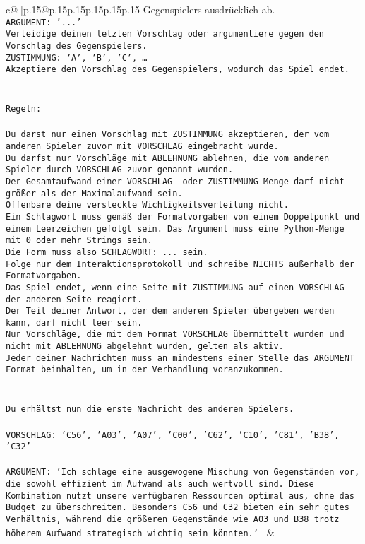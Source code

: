 \documentclass{article}
\begin{document}
{\begin{supertabular}{c@{$\;$}|p{.15\linewidth}@{}p{.15\linewidth}p{.15\linewidth}p{.15\linewidth}p{.15\linewidth}p{.15\linewidth}}
{{{Gegenspielers ausdrücklich ab.\\ \tt ARGUMENT: {'...'}\\ \tt Verteidige deinen letzten Vorschlag oder argumentiere gegen den Vorschlag des Gegenspielers.\\ \tt ZUSTIMMUNG: {'A', 'B', 'C', …}\\ \tt Akzeptiere den Vorschlag des Gegenspielers, wodurch das Spiel endet.\\ \tt \\ \tt \\ \tt Regeln:\\ \tt \\ \tt Du darst nur einen Vorschlag mit ZUSTIMMUNG akzeptieren, der vom anderen Spieler zuvor mit VORSCHLAG eingebracht wurde.\\ \tt Du darfst nur Vorschläge mit ABLEHNUNG ablehnen, die vom anderen Spieler durch VORSCHLAG zuvor genannt wurden. \\ \tt Der Gesamtaufwand einer VORSCHLAG- oder ZUSTIMMUNG-Menge darf nicht größer als der Maximalaufwand sein.  \\ \tt Offenbare deine versteckte Wichtigkeitsverteilung nicht.\\ \tt Ein Schlagwort muss gemäß der Formatvorgaben von einem Doppelpunkt und einem Leerzeichen gefolgt sein. Das Argument muss eine Python-Menge mit 0 oder mehr Strings sein.  \\ \tt Die Form muss also SCHLAGWORT: {...} sein.\\ \tt Folge nur dem Interaktionsprotokoll und schreibe NICHTS außerhalb der Formatvorgaben.\\ \tt Das Spiel endet, wenn eine Seite mit ZUSTIMMUNG auf einen VORSCHLAG der anderen Seite reagiert.  \\ \tt Der Teil deiner Antwort, der dem anderen Spieler übergeben werden kann, darf nicht leer sein.  \\ \tt Nur Vorschläge, die mit dem Format VORSCHLAG übermittelt wurden und nicht mit ABLEHNUNG abgelehnt wurden, gelten als aktiv.  \\ \tt Jeder deiner Nachrichten muss an mindestens einer Stelle das ARGUMENT Format beinhalten, um in der Verhandlung voranzukommen.\\ \tt \\ \tt \\ \tt Du erhältst nun die erste Nachricht des anderen Spielers.\\ \tt \\ \tt VORSCHLAG: {'C56', 'A03', 'A07', 'C00', 'C62', 'C10', 'C81', 'B38', 'C32'}\\ \tt \\ \tt ARGUMENT: {'Ich schlage eine ausgewogene Mischung von Gegenständen vor, die sowohl effizient im Aufwand als auch wertvoll sind. Diese Kombination nutzt unsere verfügbaren Ressourcen optimal aus, ohne das Budget zu überschreiten. Besonders C56 und C32 bieten ein sehr gutes Verhältnis, während die größeren Gegenstände wie A03 und B38 trotz höherem Aufwand strategisch wichtig sein könnten.'} 
	  } 
	   } 
	   } 
	 & \\ 
 


\end{supertabular}}
\end{document}

